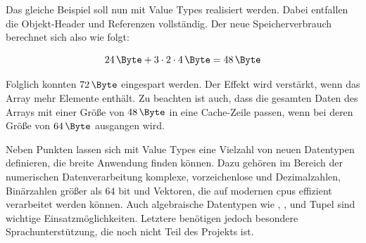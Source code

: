 Das gleiche Beispiel soll nun mit Value Types realisiert werden.
Dabei entfallen die Objekt-Header und Referenzen vollständig.
Der neue Speicherverbrauch berechnet sich also wie folgt:

\begin{equation}
    \SI{24}{\Byte} + 3 \cdot 2 \cdot \SI{4}{\Byte} = \SI{48}{\Byte}\label{eq:memory-usage-inline}
\end{equation}

Folglich konnten $\SI{72}{\Byte}$ eingespart werden.
Der Effekt wird verstärkt, wenn das Array mehr Elemente enthält.
Zu beachten ist auch, dass die gesamten Daten des Arrays mit einer Größe von $\SI{48}{\Byte}$ in eine Cache-Zeile passen, wenn bei deren Größe von $\SI{64}{\Byte}$ ausgangen wird.

Neben Punkten lassen sich mit Value Types eine Vielzahl von neuen Datentypen definieren, die breite Anwendung finden können.
Dazu gehören im Bereich der numerischen Datenverarbeitung komplexe, vorzeichenlose und Dezimalzahlen, Binärzahlen größer als 64 bit und Vektoren, die auf modernen \acp{cpu} effizient verarbeitet werden können.
Auch algebraische Datentypen wie , ,  und Tupel sind wichtige Einsatzmöglichkeiten.
Letztere benötigen jedoch besondere Sprachunterstützung, die noch nicht Teil des Projekts ist.
